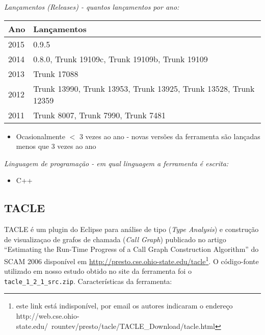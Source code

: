 \begin{description}

  \item {\it Lançamentos ({\it Releases}) - quantos lançamentos por ano:}
    \begin{table}[h!]
      \centering
      \begin{tabular}{| l | l |}
        \hline
        Ano  & Lançamentos                                                     \\
        \hline
        2015 & 0.9.5                                                           \\
        2014 & 0.8.0, Trunk 19109c, Trunk 19109b, Trunk 19109                  \\
        2013 & Trunk 17088                                                     \\
        2012 & Trunk 13990, Trunk 13953, Trunk 13925, Trunk 13528, Trunk 12359 \\
        2011 & Trunk 8007, Trunk 7990, Trunk 7481                              \\
        \hline
      \end{tabular}
    \end{table}
    \begin{itemize}
      \item Ocasionalmente $<$ 3 vezes ao ano - novas versões da ferramenta são lançadas menos que 3 vezes ao ano
    \end{itemize}

  \item {\it Linguagem de programação - em qual linguagem a ferramenta é escrita:}
    \begin{itemize}
      \item C++
    \end{itemize}

\end{description}

\subsection{TACLE}

TACLE é um plugin do Eclipse para análise de tipo ({\it Type Analysis}) e
construção de visualizaçao de grafos de chamada ({\it Call Graph}) publicado
no artigo ``Estimating the Run-Time Progress of a Call Graph Construction
Algorithm'' do SCAM 2006 disponível em
\url{http://presto.cse.ohio-state.edu/tacle}\footnote{este link está
indisponível, por email os autores indicaram o endereço
http://web.cse.ohio-state.edu/~rountev/presto/tacle/TACLE\_Download/tacle.html}.
O código-fonte utilizado em nosso estudo obtido no site da ferramenta foi o
\texttt{tacle\_1\_2\_1\_src.zip}. Características da ferramenta:

